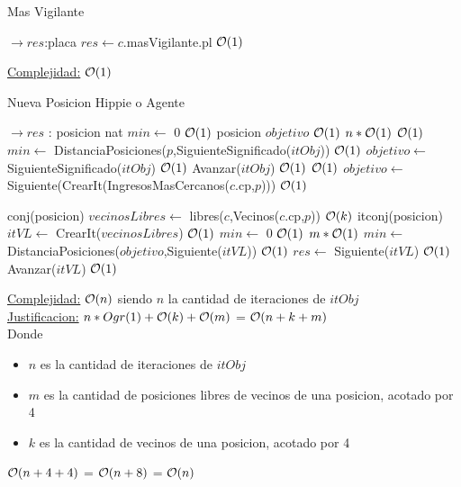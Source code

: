 \begin{Algoritmos}
\begin{algorithm}[H]
\caption{Mas Vigilante}
\begin{algorithmic}[1]
 $\to res$:placa
	\State $res \gets c$.masVigilante.pl \Comment $\mathcal{O}(1)$
\EndProcedure
\end{algorithmic}
\underline{Complejidad:} $\mathcal{O}(1)$
\end{algorithm}

\begin{algorithm}[H]
\caption{Nueva Posicion Hippie o Agente}
\begin{algorithmic}[1]
  $\to res$ : posicion
	\State nat $min \gets$ 0 \Comment $\mathcal{O}(1)$
	\State posicion $objetivo$ \Comment $\mathcal{O}(1)$
	 \Comment $n*\mathcal{O}(1)$
		 \Comment $\mathcal{O}(1)$
			\State $min \gets$ DistanciaPosiciones($p$,SiguienteSignificado($itObj$)) \Comment $\mathcal{O}(1)$
			\State $objetivo \gets$ SiguienteSignificado($itObj$) \Comment $\mathcal{O}(1)$
		\EndIf
		\State Avanzar($itObj$) \Comment $\mathcal{O}(1)$
	\EndWhile
	 \Comment $\mathcal{O}(1)$
		\State $objetivo \gets$ Siguiente(CrearIt(IngresosMasCercanos($c$.cp,$p$)))	 \Comment $\mathcal{O}(1)$	
	\EndIf
	
	\State conj(posicion) $vecinosLibres \gets$ libres($c$,Vecinos($c$.cp,$p$)) \Comment $\mathcal{O}(k)$
	\State itconj(posicion) $itVL \gets$ CrearIt($vecinosLibres$) \Comment $\mathcal{O}(1)$
	\State $min \gets$ 0 \Comment $\mathcal{O}(1)$
	 \Comment $m*\mathcal{O}(1)$
			\State $min \gets$ DistanciaPosiciones($objetivo$,Siguiente($itVL$)) \Comment $\mathcal{O}(1)$
			\State $res \gets$ Siguiente($itVL$) \Comment $\mathcal{O}(1)$
		\EndIf
		\State Avanzar($itVL$) \Comment $\mathcal{O}(1)$
	\EndWhile
\EndProcedure
\end{algorithmic}
\underline{Complejidad:} $\mathcal{O}(n)$ siendo $n$ la cantidad de iteraciones de $itObj$ \\
\underline{Justificacion:} $n*Ogr(1)+\mathcal{O}(k)+\mathcal{O}(m)$ = $\mathcal{O}(n+k+m)$\\
Donde
\begin{itemize}
	\item $n$ es la cantidad de iteraciones de $itObj$
	\item $m$ es la cantidad de posiciones libres de vecinos de una posicion, acotado por 4
	\item $k$ es la cantidad de vecinos de una posicion, acotado por 4
\end{itemize}
$\mathcal{O}(n + 4 + 4)$ = $\mathcal{O}(n + 8)$ = $\mathcal{O}(n)$
\end{algorithm}



\end{Algoritmos}
